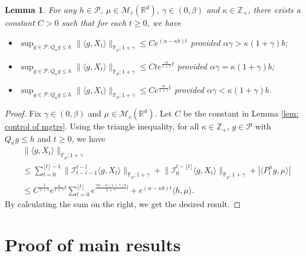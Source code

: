\documentclass[12pt,a4paper]{amsart}
\theoremstyle{plain}
\newtheorem{lem}[thm]{Lemma}
\theoremstyle{definition}
\numberwithin{equation}{section}
\begin{document}
\begin{lem}
\label{lem: control moment}
    For any $h \in \mathcal P$, $\mu \in \mathcal M_c(\mathbb R^d)$, $\gamma\in (0, \beta)$ and $\kappa \in \mathbb Z_+$, there exists a constant $C > 0$ such that for each $t\geq 0$, we have
\begin{itemize}
\item[(1)]
    $\sup_{g\in \mathcal P: Q_\kappa g \leq h}\|\langle g,X_t\rangle\|_{\mathbb{P}_{\mu};1+\gamma}\leq C e^{(\alpha-\kappa b)t}$ provided $\alpha\gamma > \kappa (1+\gamma)b$;
\item[(2)]
    $\sup_{g\in \mathcal P: Q_\kappa g \leq h}\|\langle g,X_t\rangle\|_{\mathbb{P}_{\mu};1+\gamma}\leq C te^{\frac{\alpha}{1+\gamma}t}$ provided $\alpha\gamma = \kappa (1+\gamma)b$;
\item[(3)]
    $\sup_{g\in \mathcal P: Q_\kappa g \leq h} \|\langle g,X_t\rangle\|_{\mathbb{P}_{\mu};1+\gamma}\leq C e^{\frac{\alpha}{1+\gamma}t}$ provided $\alpha\gamma < \kappa (1+\gamma)b$.
\end{itemize}
\end{lem}
\begin{proof}
    Fix $\gamma \in (0,\beta)$ and $\mu \in \mathcal M_c(\mathbb R^d)$.
    Let $C$ be the constant in Lemma \ref{lem: control of mgtrs}.
    Using the triangle inequality, for all $\kappa\in \mathbb Z_+$, $g \in \mathcal P$ with $Q_\kappa g \leq h$ and $t\geq 0$, we have
\begin{equation}\begin{split}
    &\|\langle g,X_t\rangle\|_{\mathbb P_\mu;1+\gamma}
        \\ &\leq \sum_{l=0}^{\lfloor t\rfloor - 1}\big\| \mathcal{I}_{t-l-1}^{t-l}\langle g,X_t\rangle \big\|_{\mathbb P_\mu;1+\gamma}+\big\| \mathcal{I}_{0}^{t-\lfloor t \rfloor}\langle g,X_t\rangle  \big\|_{\mathbb P_\mu;1+\gamma}
    + |\langle P^\alpha_t g,\mu\rangle|
    \\ &\leq C^{\frac{1}{1+\gamma}} e^{\frac{\alpha}{1+\gamma}t} \sum_{l=0}^{\lfloor t\rfloor} e^{\frac{\gamma\alpha-\kappa (1+\gamma)b}{1+\gamma} l} + e^{(\alpha - \kappa b)t} \langle h,\mu\rangle.
\end{split}\end{equation}
    By calculating the sum on the right, we get the desired result.
\end{proof}

\section{Proof of main results}
\end{document}
